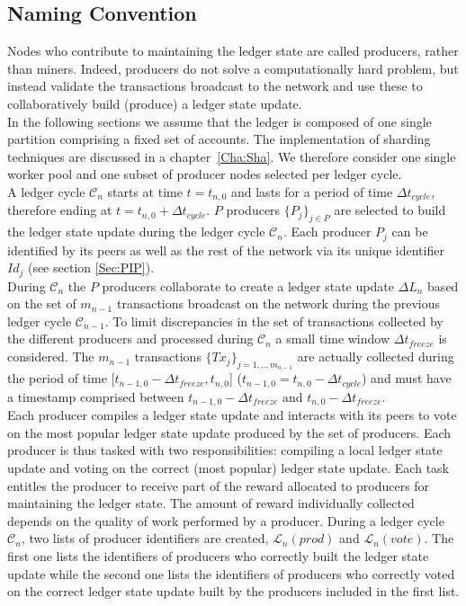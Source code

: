 \subsection{Naming Convention}

Nodes who contribute to maintaining the ledger state are called producers, rather than miners. Indeed, producers do not solve a computationally hard problem, but instead validate the transactions broadcast to the network and use these to collaboratively build (produce) a ledger state update. \\

In the following sections we assume that the ledger is composed of one single partition comprising a fixed set of accounts. The implementation of sharding techniques are discussed in a chapter~\ref{Cha:Sha}. 
We therefore consider one single worker pool and one subset of producer nodes selected per ledger cycle. \\

A ledger cycle $\mathcal{C}_n$ starts at time $t = t_{n,0}$ and lasts for a period of time $\Delta t_{cycle}$, therefore ending at $t = t_{n,0}+ \Delta t_{cycle}$. $P$ producers $\{P_j\}_{j\in P}$ are selected to build the ledger state update during the ledger cycle $\mathcal{C}_n$. Each producer $P_j$ can be identified by its peers as well as the rest of the network via its unique identifier $Id_j$ (see section \ref{Sec:PIP}).\\

During $\mathcal{C}_n$ the $P$ producers collaborate to create a ledger state update $\Delta L_{n}$ based on the set of $m_{n-1}$ transactions broadcast on the network during the previous ledger cycle $\mathcal{C}_{n-1}$. To limit discrepancies in the set of transactions collected by the different producers and processed during $\mathcal{C}_n$ a small time window $\Delta t_{freeze}$ is considered. The $m_{n-1}$ transactions $\{Tx_j\}_{j=1,..,m_{n-1}}$ are actually collected during the period of time [$t_{n-1,0} - \Delta t_{freeze}, t_{n,0}$] ($t_{n-1,0} = t_{n,0} - \Delta t_{cycle}$) and must have a timestamp comprised between $t_{n-1,0} - \Delta t_{freeze}$ and $t_{n,0} - \Delta t_{freeze}$.\\

Each producer compiles a ledger state update and interacts with its peers to vote on the most popular ledger state update produced by the set of producers. Each producer is thus tasked with two responsibilities: compiling a local ledger state update and voting on the correct (most popular) ledger state update. Each task entitles the producer to receive part of the reward allocated to producers for maintaining the ledger state. The amount of reward individually collected depends on the quality of work performed by a producer. During a ledger cycle $\mathcal{C}_n$, two lists of producer identifiers are created, $\mathcal{L}_n(prod)$ and $\mathcal{L}_n(vote)$. The first one lists the identifiers of producers who correctly built the ledger state update while the second one lists the identifiers of producers who correctly voted on the correct ledger state update built by the producers included in the first list.\\


